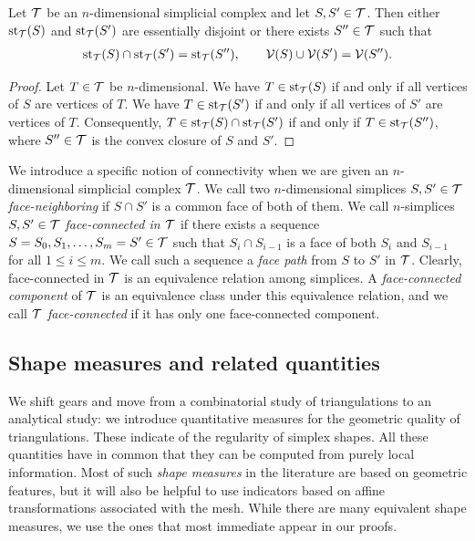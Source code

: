 \documentclass[10pt,letterpaper]{article}
\begin{document}
\begin{lemma}
 Let ${\mathcal T}$ be an $n$-dimensional simplicial complex and let $S,S' \in {\mathcal T}$.
 Then either $\operatorname{st}_{{\mathcal T}}(S)$ and $\operatorname{st}_{{\mathcal T}}(S')$ are essentially disjoint or there exists $S'' \in {\mathcal T}$
 such that 
 \begin{align*}
    \operatorname{st}_{{\mathcal T}}(S) \cap \operatorname{st}_{{\mathcal T}}(S') = \operatorname{st}_{{\mathcal T}}(S''),
    \qquad 
    {\mathcal V}(S) \cup {\mathcal V}(S') = {\mathcal V}(S'').
 \end{align*}
\end{lemma}
\begin{proof}
 Let $T \in {\mathcal T}$ be $n$-dimensional.
 We have $T \in \operatorname{st}_{{\mathcal T}}(S )$ if and only if all vertices of $S $ are vertices of $T$.
 We have $T \in \operatorname{st}_{{\mathcal T}}(S')$ if and only if all vertices of $S'$ are vertices of $T$.
 Consequently, $T \in \operatorname{st}_{{\mathcal T}}(S) \cap \operatorname{st}_{{\mathcal T}}(S')$ if and only if $T \in \operatorname{st}_{{\mathcal T}}(S'')$,
 where $S'' \in {\mathcal T}$ is the convex closure of $S$ and $S'$.
\end{proof}

We introduce a specific notion of connectivity when we are given an $n$-dimensional simplicial complex ${\mathcal T}$. 
We call two $n$-dimensional simplices $S, S' \in {\mathcal T}$ \emph{face-neighboring} if $S \cap S'$ is a common face of both of them. 
We call $n$-simplices $S,S' \in {\mathcal T}$ \emph{face-connected in ${\mathcal T}$} if there exists a sequence $S=S_0,S_1,\dots,S_m=S' \in {\mathcal T}$ such that $S_{i} \cap S_{i-1}$ is a face of both $S_{i}$ and $S_{i-1}$ for all $1 \leq i \leq m$. 
We call such a sequence a \emph{face path} from $S$ to $S'$ in ${\mathcal T}$. 
Clearly, face-connected in ${\mathcal T}$ is an equivalence relation among simplices. 
A \emph{face-connected component} of ${\mathcal T}$ is an equivalence class under this equivalence relation, 
and we call ${\mathcal T}$ \emph{face-connected} if it has only one face-connected component. 


\subsection{Shape measures and related quantities}

We shift gears and move from a combinatorial study of triangulations to an analytical study:
we introduce quantitative measures for the geometric quality of triangulations. 
These indicate of the regularity of simplex shapes. 
All these quantities have in common that they can be computed from purely local information. 
Most of such \emph{shape measures} in the literature are based on geometric features, 
but it will also be helpful to use indicators based on affine transformations associated with the mesh. %
While there are many equivalent shape measures, we use the ones that most immediate appear in our proofs.
\end{document}
